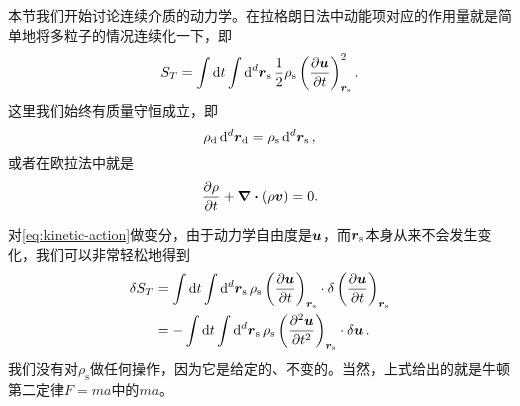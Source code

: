本节我们开始讨论连续介质的动力学。在拉格朗日法中动能项对应的作用量就是简单地将多粒子的情况连续化一下，即
\begin{equation}
    S_T = \int \dd{t} \int \dd[d]{\vb*{r}_\text{s}} \frac{1}{2} \rho_\text{s} \left( \pdv{\vb*{u}}{t} \right)_{\vb*{r}_\text{s}}^2.
    \label{eq:kinetic-action}
\end{equation}
这里我们始终有质量守恒成立，即
\begin{equation}
    \rho_\text{d} \dd[d]{\vb*{r}_\text{d}} = \rho_\text{s} \dd[d]{\vb*{r}_\text{s}},
    \label{eq:density-eq}
\end{equation}
或者在欧拉法中就是
\begin{equation}
    \pdv{\rho}{t} + \div{(\rho \vb*{v})} = 0.
    \label{eq:mass-conservation}
\end{equation}

对\eqref{eq:kinetic-action}做变分，由于动力学自由度是$\vb*{u}$，而$\vb*{r}_\text{s}$本身从来不会发生变化，我们可以非常轻松地得到
\begin{equation}
    \begin{aligned}
        \var{S_T} &= \int \dd{t} \int \dd[d]{\vb*{r}_\text{s}}  \rho_\text{s} \left( \pdv{\vb*{u}}{t} \right)_{\vb*{r}_\text{s}} \cdot \var{\left( \pdv{\vb*{u}}{t} \right)_{\vb*{r}_\text{s}}} \\
        &= - \int \dd{t} \int \dd[d]{\vb*{r}_\text{s}}  \rho_\text{s} \left( \pdv[2]{\vb*{u}}{t} \right)_{\vb*{r}_\text{s}} \cdot \var{\vb*{u}}.
    \end{aligned}
\end{equation}
我们没有对$\rho_\text{s}$做任何操作，因为它是给定的、不变的。当然，上式给出的就是牛顿第二定律$F=ma$中的$ma$。

